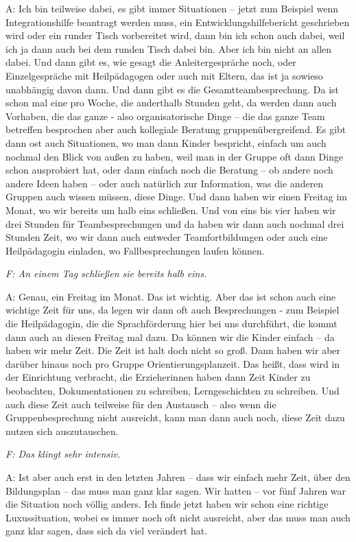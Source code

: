 A: Ich bin teilweise dabei, es gibt immer Situationen – jetzt zum Beispiel wenn Integrationshilfe beantragt werden muss, ein Entwicklungshilfebericht geschrieben wird oder ein runder Tisch vorbereitet wird, dann bin ich schon auch dabei, weil ich ja dann auch bei dem runden Tisch dabei bin. Aber ich bin nicht an allen dabei. Und dann gibt es, wie gesagt die Anleitergespräche noch, oder Einzelgespräche mit Heilpädagogen oder auch mit Eltern, das ist ja sowieso unabhängig davon dann. Und dann gibt es die Gesamtteambesprechung. Da ist schon mal eine pro Woche, die anderthalb Stunden geht, da werden dann auch Vorhaben, die das ganze - also organisatorische Dinge – die das ganze Team betreffen besprochen aber auch kollegiale Beratung gruppenübergreifend. Es gibt dann ost auch Situationen, wo man dann Kinder bespricht, einfach um auch nochmal den Blick von außen zu haben, weil man in der Gruppe oft dann Dinge schon ausprobiert hat, oder dann einfach noch die Beratung – ob andere noch andere Ideen haben – oder auch natürlich zur Information, was die anderen Gruppen auch wissen müssen, diese Dinge. Und dann haben wir einen Freitag im Monat, wo wir bereits um halb eins schließen. Und von eins bis vier haben wir drei Stunden für Teambesprechungen und da haben wir dann auch nochmal drei Stunden Zeit, wo wir dann auch entweder Teamfortbildungen oder auch eine Heilpädagogin einladen, wo Fallbesprechungen laufen können.

\emph{F: An einem Tag schließen sie bereits halb eins.} 

A: Genau, ein Freitag im Monat. Das ist wichtig. Aber das ist schon auch eine wichtige Zeit für uns, da legen wir dann oft auch Besprechungen - zum Beispiel die Heilpädagogin, die die Sprachförderung hier bei uns durchführt, die kommt dann auch an diesen Freitag mal dazu. Da können wir die Kinder einfach – da haben wir mehr Zeit. Die Zeit ist halt doch nicht so groß. Dann haben wir aber darüber hinaus noch pro Gruppe Orientierungsplanzeit. Das heißt, dass wird in der Einrichtung verbracht, die Erzieherinnen haben dann Zeit Kinder zu beobachten, Dokumentationen zu schreiben, Lerngeschichten zu schreiben. Und auch diese Zeit auch teilweise für den Austausch – also wenn die Gruppenbesprechung nicht ausreicht, kann man dann auch noch, diese Zeit dazu nutzen sich auszutauschen. 

\emph{F: Das klingt sehr intensiv.}

A: Ist aber auch erst in den letzten Jahren – dass wir einfach mehr Zeit, über den Bildungsplan – das muss man ganz klar sagen. Wir hatten – vor fünf Jahren war die Situation noch völlig anders. Ich finde jetzt haben wir schon eine richtige Luxussituation, wobei es immer noch oft nicht ausreicht, aber das muss man auch ganz klar sagen, dass sich da viel verändert hat.

